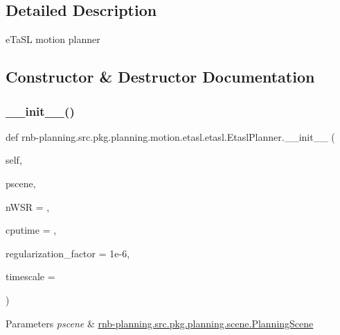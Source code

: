 \subsection{Detailed Description}
e\+Ta\+SL motion planner 

\subsection{Constructor \& Destructor Documentation}
\mbox{\label{classrnb-planning_1_1src_1_1pkg_1_1planning_1_1motion_1_1etasl_1_1etasl_1_1_etasl_planner_af097404c7d380f72df98f1dd100373b8}} 
\subsubsection{\texorpdfstring{\+\_\+\+\_\+init\+\_\+\+\_\+()}{\_\_init\_\_()}}
{\footnotesize\ttfamily def rnb-\/planning.\+src.\+pkg.\+planning.\+motion.\+etasl.\+etasl.\+Etasl\+Planner.\+\_\+\+\_\+init\+\_\+\+\_\+ (\begin{DoxyParamCaption}\item[{}]{self,  }\item[{}]{pscene,  }\item[{}]{n\+W\+SR = {},  }\item[{}]{cputime = {},  }\item[{}]{regularization\+\_\+factor = {\ttfamily 1e-\/6},  }\item[{}]{timescale = {} }\end{DoxyParamCaption})}


\begin{DoxyParams}{Parameters}
{\em pscene} & \hyperlink{classrnb-planning_1_1src_1_1pkg_1_1planning_1_1scene_1_1_planning_scene}{rnb-\/planning.\+src.\+pkg.\+planning.\+scene.\+Planning\+Scene} \\
\hline
\end{DoxyParams}


